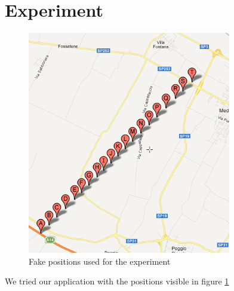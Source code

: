 \section{Experiment}
	\begin{figure}[htbp]
	\centering
	\includegraphics[width=3.5in]{imgs/punti_mappa.png}
	\caption{Fake positions used for the experiment}
	\label{fig:positions_experiment}
	\end{figure}
	We tried our application with the positions visible in figure \ref{fig:positions_experiment}
